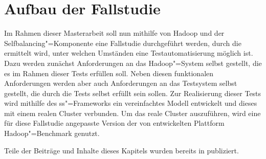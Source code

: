 \chapter{Aufbau der Fallstudie}
\label{sec:fallstudie}

Im Rahmen dieser Masterarbeit soll nun mithilfe von Hadoop und der Selfbalancing"=Komponente eine Fallstudie durchgeführt werden, durch die ermittelt wird, unter welchen Umständen eine Testautomatisierung möglich ist.
Dazu werden zunächst Anforderungen an das Hadoop"=System selbst gestellt, die es im Rahmen dieser Tests erfüllen soll.
Neben diesen funktionalen Anforderungen werden aber auch Anforderungen an das Testsystem selbst gestellt, die durch die Tests selbst erfüllt sein sollen.
Zur Realisierung dieser Tests wird mithilfe des \ac{ss}"=Frameworks ein vereinfachtes Modell entwickelt und dieses mit einem realen Cluster verbunden.
Um das reale Cluster auszuführen, wird eine für diese Fallstudie angepasste Version der von \citeauthor{zhang2016} entwickelten Plattform Hadoop"=Benchmark genutzt.

Teile der Beiträge und Inhalte dieses Kapitels wurden bereits in \cite{Eberhardinger2018} publiziert.








